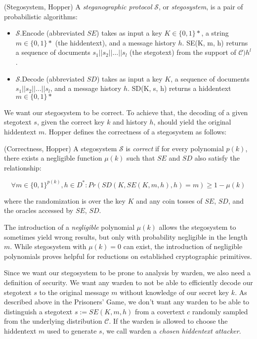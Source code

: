 \documentclass[english,version-2020-11]{uzl-thesis}
\begin{document}
\begin{definition}
(Stegosystem, Hopper) A \emph{steganographic protocol} $\mathcal{S}$, or \emph{stegosystem}, is a pair of probabilistic algorithms:

\begin{itemize}
	\item $\mathcal{S}$.Encode (abbreviated $SE$) takes as input a key $K \in \{0,1\}*$, a string $m \in \{0,1\}*$ (the hiddentext), and a message history $h$.
		SE(K, m, h) returns a sequence of documents $s_1||s_2||\dots||s_l$ (the stegotext) from the support of $\mathcal{C})h^l$.
	\item $\mathcal{S}$.Decode (abbreviated $SD$) takes as input a key $K$, a sequence of documents $s_1||s_2||\dots||s_l$, and a message history $h$.
		SD(K, s, h) returns a hiddentext $m \in \{0,1\}*$
\end{itemize}
\end{definition}

We want our stegosystem to be correct.
To achieve that, the decoding of a given stegotext $s$, given the correct key $k$ and history $h$, should yield the original hiddentext $m$.
Hopper defines the correctness of a stegosystem as follows:

\begin{definition}
(Correctness, Hopper) A stegosystem $\mathcal{S}$ is \emph{correct} if for every polynomial $p(k)$, there exists a negligible function $\mu(k)$ such that $SE$ and $SD$ also satisfy the relationship:

$$\forall m \in \{0,1\}^{p(k)}, h \in D^* \colon Pr(SD(K, SE(K, m, h), h) = m) \geq 1 - \mu(k)$$

where the randomization is over the key $K$ and any coin tosses of $SE$, $SD$, and the oracles accessed by $SE$, $SD$.
\end{definition}

The introduction of a \emph{negligible} polynomial $\mu(k)$ allows the stegosystem to sometimes yield wrong results, but only with probability negligible in the length $m$.
While stegosystem with $\mu(k) = 0$ can exist, the introduction of negligible polynomials proves helpful for reductions on established cryptographic primitives. 

Since we want our stegosystem to be prone to analysis by warden, we also need a definition of security.
We want any warden to not be able to efficiently decode our stegotext $s$ to the original message $m$ without knowledge of our secret key $k$.
As described above in the Prisoners' Game, we don't want any warden to be able to distinguish a stegotext $s := SE(K, m, h)$ from a covertext $c$ randomly sampled from the underlying distribution $\mathcal{C}$.
If the warden is allowed to choose the hiddentext $m$ used to generate $s$, we call warden a \emph{chosen hiddentext attacker}. 
\end{document}
